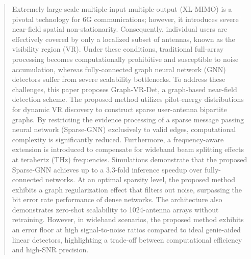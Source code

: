 \begin{abstract}
Extremely large-scale multiple-input multiple-output (XL-MIMO) is a pivotal technology for 6G communications; however, it introduces severe near-field spatial non-stationarity. Consequently, individual users are effectively covered by only a localized subset of antennas, known as the visibility region (VR). Under these conditions, traditional full-array processing becomes computationally prohibitive and susceptible to noise accumulation, whereas fully-connected graph neural network (GNN) detectors suffer from severe scalability bottlenecks. To address these challenges, this paper proposes Graph-VR-Det, a graph-based near-field detection scheme. The proposed method utilizes pilot-energy distributions for dynamic VR discovery to construct sparse user-antenna bipartite graphs. By restricting the evidence processing of a sparse message passing neural network (Sparse-GNN) exclusively to valid edges, computational complexity is significantly reduced. Furthermore, a frequency-aware extension is introduced to compensate for wideband beam splitting effects at terahertz (THz) frequencies. Simulations demonstrate that the proposed Sparse-GNN achieves up to a 3.3-fold inference speedup over fully-connected networks. At an optimal sparsity level, the proposed method exhibits a graph regularization effect that filters out noise, surpassing the bit error rate performance of dense networks. The architecture also demonstrates zero-shot scalability to 1024-antenna arrays without retraining. However, in wideband scenarios, the proposed method exhibits an error floor at high signal-to-noise ratios compared to ideal genie-aided linear detectors, highlighting a trade-off between computational efficiency and high-SNR precision.
\end{abstract}